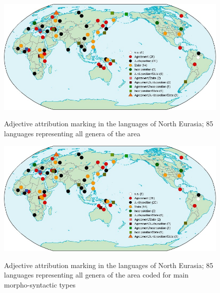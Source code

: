 \newpage
\begin{figure}
    
        \caption[Adjective attribution marking, North Eurasia]{Adjective attribution marking in the languages of North Eurasia; 85 languages representing all genera of the area}

\includegraphics[width=\textwidth]{figures/WorldMapTyp.jpg}%
\label{NEMap}
\end{figure}

\newpage
\begin{figure}
    
        \caption[Adjective attribution marking, North Eurasia, main types]{Adjective attribution marking in the languages of North Eurasia; 85 languages representing all genera of the area coded for main morpho-syntactic types}

\includegraphics[width=\textwidth]{figures/WorldMapTyp.jpg}%
\label{NEMapTyp}
\end{figure}

